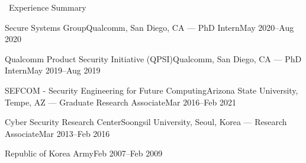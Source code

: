 \documentclass{resume} %
\begin{document}
\begin{rSection}{\faGenderless~Experience Summary}

    \begin{rSubsection2}
        {Secure Systems Group}{Qualcomm, San Diego, CA}
        {--- PhD Intern}{May 2020--Aug 2020}
    \end{rSubsection2}
    \vspace{-3mm}

    \begin{rSubsection2}
        {Qualcomm Product Security Initiative (QPSI)}{Qualcomm, San Diego, CA}
        {--- PhD Intern}{May 2019--Aug 2019}
    \end{rSubsection2}
    \vspace{-3mm}

    \begin{rSubsection2}
		{SEFCOM - {\small Security Engineering for Future Computing}}{Arizona State University, Tempe, AZ}
		{--- Graduate Research Associate}{Mar 2016--Feb 2021}
	\end{rSubsection2}
    \vspace{-3mm}

	\begin{rSubsection2}
		{Cyber Security Research Center}{Soongsil University, Seoul, Korea}
		{--- Research Associate}{Mar 2013--Feb 2016}
	\end{rSubsection2}
	\vspace{-3mm}

	\begin{rSubsection2}
		{Republic of Korea Army}{Feb 2007--Feb 2009}
		{}{}
	\end{rSubsection2}

\vspace{3mm}
\end{rSection}

\end{document}
